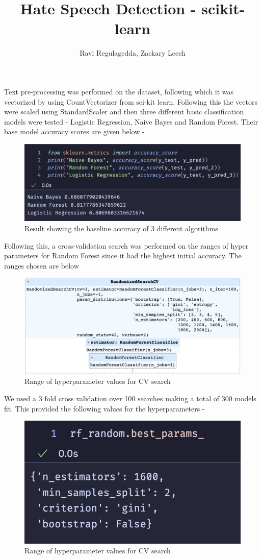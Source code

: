 \documentclass[a4, 11pt]{article}
\title{Hate Speech Detection - scikit-learn}
\author{Ravi Regulagedda, Zackary Leech}
\date{}
\begin{document}
\maketitle
Text pre-processing was performed on the dataset, following which it was vectorized by using CountVectorizer from sci-kit learn. Following this
the vectors were scaled using StandardScaler and then three different basic classification models were tested - Logistic Regression,
 Naive Bayes and Random Forest. Their base model accuracy scores are given below - 
\begin{figure}[H]
\center
\includegraphics[scale=0.4]{first.png}
\caption{Result showing the baseline accuracy of 3 different algorithms}
\end{figure}
Following this, a cross-validation search was performed on the ranges of hyper parameters for Random Forest since it had the highest
initial accuracy. The ranges chosen are below \-
\begin{figure}[H]
\center
\includegraphics[scale=0.4]{second.png}
\caption{Range of hyperparameter values for CV search}
\end{figure}
We used a 3 fold cross validation over 100 searches making a total of 300 models fit. This provided the following values for the 
hyperparameters -
\begin{figure}[H]
    \center
    \includegraphics[scale=0.4]{third.png}
    \caption{Range of hyperparameter values for CV search}
\end{figure}
\end{document}
